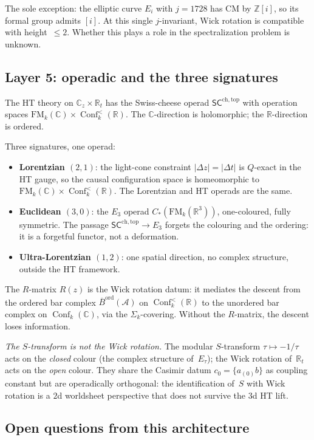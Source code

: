 \documentclass[11pt]{article}
\newcommand{\cA}{\mathcal{A}}
\newcommand{\barB}{\overline{B}}
\newcommand{\C}{\mathbb{C}}
\newcommand{\Z}{\mathbb{Z}}
\newcommand{\R}{\mathbb{R}}
\newcommand{\SCchtop}{\mathsf{SC}^{\mathrm{ch,top}}}
\newcommand{\FM}{\mathrm{FM}}
\DeclareMathOperator{\Conf}{Conf}
\begin{document}
The sole exception: the elliptic curve $E_{i}$ with $j = 1728$
has $\mathrm{CM}$ by $\Z[i]$, so its formal group admits $[i]$.
At this single $j$-invariant, Wick rotation is compatible with
height~$\le 2$.  Whether this plays a role in the spectralization
problem is unknown.

\subsection{Layer 5: operadic and the three signatures}

The HT theory on $\C_z \times \R_t$ has the Swiss-cheese operad
$\SCchtop$ with operation spaces
$\FM_k(\C) \times \Conf_k^{<}(\R)$.  The $\C$-direction is
holomorphic; the $\R$-direction is ordered.

Three signatures, one operad:
\begin{itemize}
\item \textbf{Lorentzian $(2,1)$}: the light-cone constraint
  $|{\Delta z}| = |{\Delta t}|$ is $Q$-exact in the HT gauge,
  so the causal configuration space is homeomorphic to
  $\FM_k(\C) \times \Conf_k^{<}(\R)$.  The Lorentzian and HT
  operads are the same.
\item \textbf{Euclidean $(3,0)$}: the $E_3$ operad
  $C_*(\FM_k(\R^3))$, one-coloured, fully symmetric.  The passage
  $\SCchtop \to E_3$ forgets the colouring and the ordering:
  it is a forgetful functor, not a deformation.
\item \textbf{Ultra-Lorentzian $(1,2)$}: one spatial direction,
  no complex structure, outside the HT framework.
\end{itemize}

The $R$-matrix $R(z)$ is the Wick rotation datum: it mediates
the descent from the ordered bar complex
$\barB^{\mathrm{ord}}(\cA)$ on $\Conf_k^{<}(\R)$ to the
unordered bar complex on $\Conf_k(\C)$, via the
$\Sigma_k$-covering.  Without the $R$-matrix, the descent
loses information.

\emph{The $S$-transform is not the Wick rotation.}  The modular
$S$-transform $\tau \mapsto -1/\tau$ acts on the \emph{closed}
colour (the complex structure of~$E_\tau$); the Wick rotation
of~$\R_t$ acts on the \emph{open} colour.  They share the
Casimir datum $c_0 = \{a_{(0)}b\}$ as coupling constant but
are operadically orthogonal: the identification of~$S$ with
Wick rotation is a $2$d worldsheet perspective that does not
survive the $3$d HT lift.

\subsection{Open questions from this architecture}
\end{document}
